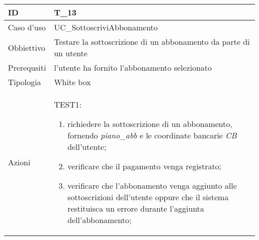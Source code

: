 \begin{table}[hb]
    \centering
    \begin{tabular}{ |p{2cm}|p{10cm}|  }
        \hline
        ID & T\_13 \\\hline
        Caso d'uso & UC\_SottoscriviAbbonamento \\\hline   
        Obbiettivo & Testare la sottoscrizione di un abbonamento da parte di un utente \\\hline
        Prerequsiti & l'utente ha fornito l'abbonamento selezionato \\\hline
        Tipologia & White box \\\hline
        Azioni & 
        TEST1:
        \begin{enumerate}[topsep=0pt]
            \item richiedere la sottoscrizione di un abbonamento, fornendo \emph{piano\_abb} e le coordinate bancarie \emph{CB} dell'utente;
            \item verificare che il pagamento venga registrato;
            \item verificare che l'abbonamento venga aggiunto alle sottoscrizioni dell'utente oppure che il sistema restituisca un errore durante l'aggiunta dell'abbonamento;
        \end{enumerate}
        \\\hline
    \end{tabular}
\end{table}



